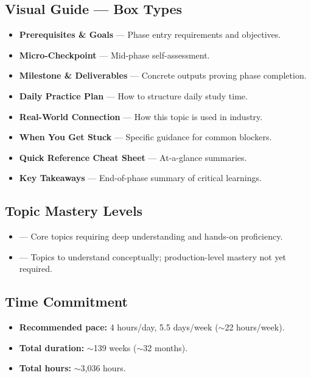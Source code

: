 \documentclass[11pt, a4paper, oneside]{report}
\begin{document}
\subsection*{Visual Guide --- Box Types}
\begin{itemize}
\item \colorbox{gray!5}{\textbf{Prerequisites \& Goals}} --- Phase entry requirements and objectives.
\item \colorbox{blue!5}{\textbf{Micro-Checkpoint}} --- Mid-phase self-assessment.
\item \colorbox{green!5}{\textbf{Milestone \& Deliverables}} --- Concrete outputs proving phase completion.
\item \colorbox{yellow!5}{\textbf{Daily Practice Plan}} --- How to structure daily study time.
\item \colorbox{teal!5}{\textbf{Real-World Connection}} --- How this topic is used in industry.
\item \colorbox{red!5}{\textbf{When You Get Stuck}} --- Specific guidance for common blockers.
\item \colorbox{cyan!5}{\textbf{Quick Reference Cheat Sheet}} --- At-a-glance summaries.
\item \colorbox{green!3}{\textbf{Key Takeaways}} --- End-of-phase summary of critical learnings.
\end{itemize}

\subsection*{Topic Mastery Levels}
\begin{itemize}
\item {} --- Core topics requiring deep understanding and hands-on proficiency.
\item {} --- Topics to understand conceptually; production-level mastery not yet required.
\end{itemize}

\subsection*{Time Commitment}
\begin{itemize}
\item \textbf{Recommended pace:} 4 hours/day, 5.5 days/week ($\sim$22 hours/week).
\item \textbf{Total duration:} $\sim$139 weeks ($\sim$32 months).
\item \textbf{Total hours:} $\sim$3,036 hours.
\end{itemize}
\end{document}
